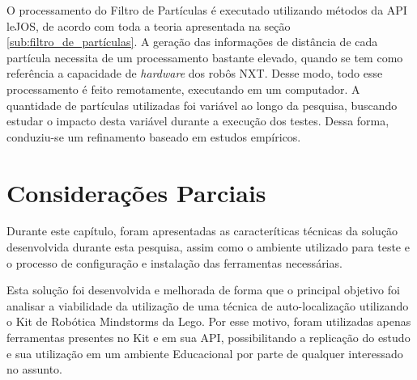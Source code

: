 O processamento do Filtro de Partículas é executado utilizando métodos da API leJOS, de acordo com toda a teoria apresentada na seção
\ref{sub:filtro_de_partículas}. A geração das informações de distância de cada partícula necessita de um processamento bastante elevado,
quando se tem como referência a capacidade de \textit{hardware} dos robôs NXT. Desse modo, todo esse processamento é feito remotamente,
executando em um computador. A quantidade de partículas utilizadas foi variável ao longo da pesquisa, buscando estudar o impacto desta variável
durante a execução dos testes. Dessa forma, conduziu-se um refinamento baseado em estudos empíricos.

\section{Considerações Parciais}

Durante este capítulo, foram apresentadas as caracteríticas técnicas da solução desenvolvida durante esta pesquisa, assim como o ambiente
utilizado para teste e o processo de configuração e instalação das ferramentas necessárias.

Esta solução foi desenvolvida e melhorada de forma que o principal objetivo foi analisar a viabilidade da utilização de uma técnica
de auto-localização utilizando o Kit de Robótica Mindstorms da Lego. Por esse motivo, foram utilizadas apenas ferramentas presentes no Kit
e em sua API, possibilitando a replicação do estudo e sua utilização em um ambiente Educacional por parte de qualquer interessado no assunto.
